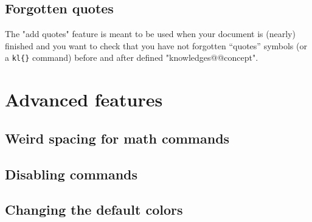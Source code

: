 \documentclass{article}
\begin{document}
\subsection{Forgotten quotes}


The "add quotes" feature is meant to be used when your document is (nearly)
finished and you want to check that you have not forgotten ``quotes'' symbols
(or a \verb|kl{}| command) before and after defined "knowledges@@concept".

\section{Advanced features}

\subsection{Weird spacing for math commands}

\subsection{Disabling commands}

\subsection{Changing the default colors}
\end{document}

